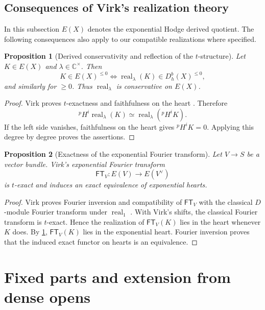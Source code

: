 \documentclass[11pt]{article}
\numberwithin{equation}{section}
\newtheorem{proposition}[proposition]{Proposition}
\theoremstyle{definition}
\theoremstyle{remark}
\newcommand{\C}{\mathbb C}
\newcommand{\real}{\operatorname{real}}
\begin{document}
\subsection{Consequences of Virk's realization theory}\label{sec:Virk}

In this subsection $E(X)$ denotes the exponential Hodge derived quotient.
The following consequences also apply to our compatible realizations where
specified.

\begin{proposition}[Derived conservativity and reflection of the $t$-structure]
\label{prop:t-reflection}
Let $K\in E(X)$ and $\lambda\in\C^\times$.  Then
\[
  K\in E(X)^{\leq0}
  \Longleftrightarrow
  \real_\lambda(K)\in D_h^b(X)^{\leq0},
\]
and similarly for $\geq0$.  Thus $\real_\lambda$ is conservative on $E(X)$.
\end{proposition}

\begin{proof}
Virk proves $t$-exactness and faithfulness on the heart
\cite[Theorems~7.5--7.6]{Virk}.  Therefore
\[
  {}^pH^i\real_\lambda(K)
  \simeq \real_\lambda({}^pH^iK).
\]
If the left side vanishes, faithfulness on the heart gives ${}^pH^iK=0$.
Applying this degree by degree proves the assertions.
\end{proof}

\begin{proposition}[Exactness of the exponential Fourier transform]
\label{prop:FT-exact}
Let $V\to S$ be a vector bundle.  Virk's exponential Fourier transform
\[
  \mathsf{FT}_V:E(V)\longrightarrow E(V^\vee)
\]
is $t$-exact and induces an exact equivalence of exponential hearts.
\end{proposition}

\begin{proof}
Virk proves Fourier inversion and compatibility of $\mathsf{FT}_V$ with the
classical $D$-module Fourier transform under $\real_1$
\cite[Theorems~5.3 and 6.12]{Virk}.  With Virk's shifts, the classical Fourier
transform is $t$-exact.  Hence the realization of $\mathsf{FT}_V(K)$ lies in the
heart whenever $K$ does.  By \cref{prop:t-reflection},
$\mathsf{FT}_V(K)$ lies in the exponential heart.  Fourier inversion proves that
the induced exact functor on hearts is an equivalence.
\end{proof}

\section{Fixed parts and extension from dense opens}\label{sec:fixed}
\end{document}
